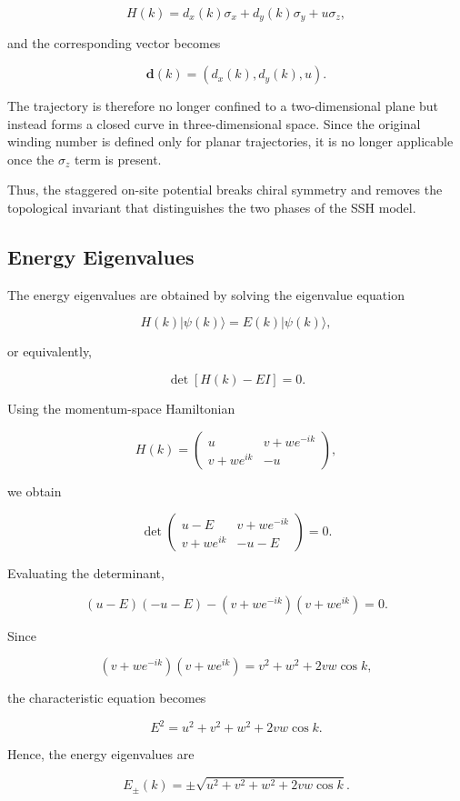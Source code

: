 \documentclass[11pt, a4paper]{article}
\begin{document}
\[
H(k)=d_x(k)\sigma_x+d_y(k)\sigma_y+u\sigma_z,
\]

and the corresponding vector becomes

\[
\mathbf d(k)=\left(d_x(k),d_y(k),u\right).
\]

The trajectory is therefore no longer confined to a two-dimensional
plane but instead forms a closed curve in three-dimensional space. Since
the original winding number is defined only for planar trajectories, it
is no longer applicable once the $\sigma_z$ term is present.

Thus, the staggered on-site potential breaks chiral symmetry and
removes the topological invariant that distinguishes the two phases of
the SSH model.


\subsection{Energy Eigenvalues}

The energy eigenvalues are obtained by solving the eigenvalue equation

\[
H(k)|\psi(k)\rangle
=
E(k)|\psi(k)\rangle,
\]

or equivalently,

\[
\det\!\left[H(k)-EI\right]=0.
\]

Using the momentum-space Hamiltonian

\[
H(k)
=
\begin{pmatrix}
u &
v+we^{-ik}\\
v+we^{ik} &
-u
\end{pmatrix},
\]

we obtain

\[
\det
\begin{pmatrix}
u-E &
v+we^{-ik}\\
v+we^{ik} &
-u-E
\end{pmatrix}
=0.
\]

Evaluating the determinant,

\[
(u-E)(-u-E)
-
(v+we^{-ik})(v+we^{ik})
=0.
\]

Since

\[
(v+we^{-ik})(v+we^{ik})
=
v^2+w^2+2vw\cos k,
\]

the characteristic equation becomes

\[
E^2
=
u^2
+
v^2
+
w^2
+
2vw\cos k.
\]

Hence, the energy eigenvalues are

\[
    E_{\pm}(k)
    =
    \pm
    \sqrt{
    u^2
    +
    v^2
    +
    w^2
    +
    2vw\cos k
    }.
\]
\end{document}
